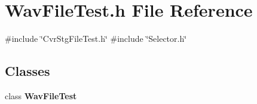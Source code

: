\section{Wav\+File\+Test.\+h File Reference}
\label{WavFileTest_8h}
{\ttfamily \#include \char`\"{}Cvr\+Stg\+File\+Test.\+h\char`\"{}}\newline
{\ttfamily \#include \char`\"{}Selector.\+h\char`\"{}}\newline
\subsection*{Classes}
\begin{DoxyCompactItemize}
\item 
class \textbf{ Wav\+File\+Test}
\end{DoxyCompactItemize}
